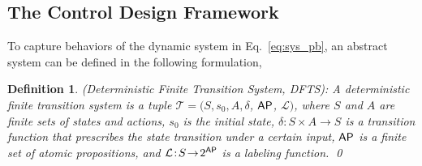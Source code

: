 \documentclass[letterpaper, 10 pt, conference]{ieeeconf}
\newtheorem{definition}{Definition}
\begin{document}
\subsection{The Control Design Framework }

To capture behaviors of the dynamic system in Eq.~\ref{eq:sys_pb}, an abstract system can be defined in the following formulation,
\begin{definition}\label{def:fts}
(Deterministic Finite Transition System, DFTS):
A deterministic finite transition system is a tuple $\mathcal{T}\!=\! (S, s_0,  A, \delta$, $\mathsf{AP}$, $\mathcal{L})$, where $S$ and $A$ are finite sets of states and actions, $s_0$ is the initial state, $\delta\!:\! S \!\times\! A \!\rightarrow\! S$ is a transition function that prescribes the state transition under a certain input, $\mathsf{AP}$ is a finite set of atomic propositions, and $\mathcal{L}\!:\! S \!\rightarrow\! 2^{\mathsf{AP}}$ is a labeling function. \qed
\end{definition}
\end{document}
